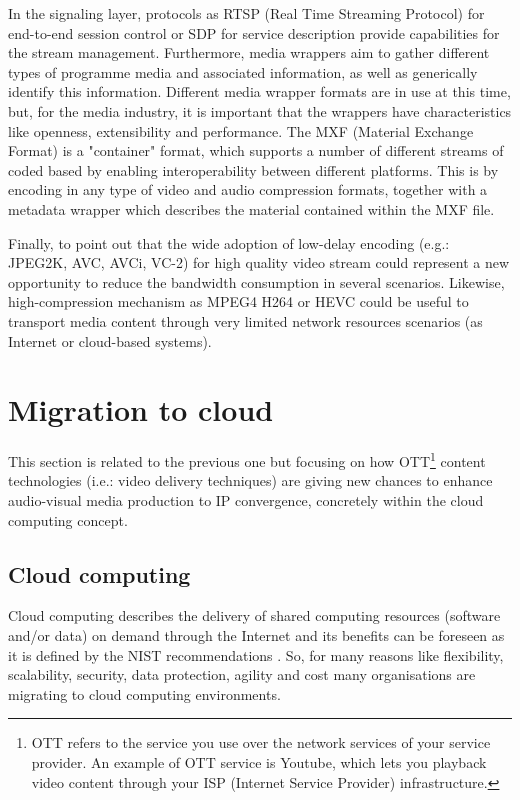 In the signaling layer, protocols as RTSP (Real Time Streaming Protocol) for end-to-end session control or SDP for service description provide capabilities for the stream management. Furthermore, media wrappers aim to gather different types of programme media and associated information, as well as generically identify this information. Different media wrapper formats are in use at this time, but, for the media industry, it is important that the wrappers have characteristics like openness, extensibility and performance. The MXF (Material Exchange Format) is a "container" format, which supports a number of different streams of coded based by enabling interoperability between different platforms. This is by encoding in any type of video and audio compression formats, together with a metadata wrapper which describes the material contained within the MXF file. 

Finally, to point out that the wide adoption of low-delay encoding (e.g.: JPEG2K, AVC, AVCi, VC-2) for high quality video stream could represent a new opportunity to reduce the bandwidth consumption in several scenarios. Likewise, high-compression mechanism as MPEG4 H264 or HEVC could be useful to transport media content through very limited network resources scenarios (as Internet or cloud-based systems).

\section{Migration to cloud}

This section is related to the previous one but focusing on how OTT\footnote{OTT refers to the service you use over the network services of your service provider. An example of OTT service is Youtube, which lets you playback video content through your ISP (Internet Service Provider) infrastructure.} \cite{ottVSiptv} content technologies (i.e.: video delivery techniques) are giving new chances to enhance audio-visual media production to IP convergence, concretely within the cloud computing concept. 

\subsection{Cloud computing}

Cloud computing describes the delivery of shared computing resources (software and/or data) on demand through the Internet and its benefits can be foreseen as it is defined by the NIST recommendations \cite{nistcc}. So, for many reasons like flexibility, scalability, security, data protection, agility and cost many organisations are migrating to cloud computing environments. 

